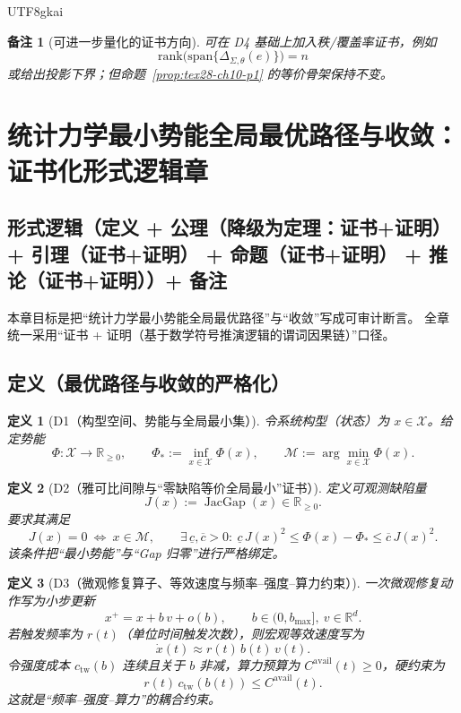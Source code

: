 \documentclass[12pt]{article}
\newtheorem{definition}{定义}[section]
\newtheorem{remark}{备注}[section]
\newcommand{\RR}{\mathbb{R}}
\newcommand{\JacGap}{\operatorname{JacGap}}
\begin{document}
\begin{CJK*}{UTF8}{gkai}
\begin{remark}[可进一步量化的证书方向]
可在 D4 基础上加入秩/覆盖率证书，例如
\[
  \mathrm{rank}\!\bigl(\mathrm{span}\{\Delta_{\Sigma,\theta}(e)\}\bigr)=n
\]
或给出投影下界；但命题~\ref{prop:tex28-ch10-p1} 的等价骨架保持不变。
\end{remark}

\clearpage

\section{统计力学最小势能全局最优路径与收敛：证书化形式逻辑章}
\label{sec:tex28-ch11}

\subsection{形式逻辑（定义 + 公理（降级为定理：证书+证明） + 引理（证书+证明） + 命题（证书+证明） + 推论（证书+证明））+ 备注}
\label{subsec:tex28-ch11-logic-structure}

本章目标是把“统计力学最小势能全局最优路径”与“收敛”写成可审计断言。
全章统一采用“证书 + 证明（基于数学符号推演逻辑的谓词因果链）”口径。

\subsection{定义（最优路径与收敛的严格化）}
\label{subsec:tex28-ch11-defs}

\begin{definition}[D1（构型空间、势能与全局最小集）]
\label{def:tex28-ch11-d1}
令系统构型（状态）为 $x\in\mathcal{X}$。给定势能
\[
  \Phi:\mathcal{X}\to\RR_{\ge 0},
  \qquad
  \Phi_*:=\inf_{x\in\mathcal{X}}\Phi(x),
  \qquad
  \mathcal{M}:=\arg\min_{x\in\mathcal{X}}\Phi(x).
\]
\end{definition}

\begin{definition}[D2（雅可比间隙与“零缺陷等价全局最小”证书）]
\label{def:tex28-ch11-d2}
定义可观测缺陷量
\[
  J(x):=\JacGap(x)\in\RR_{\ge 0}.
\]
要求其满足
\[
  J(x)=0\ \Longleftrightarrow\ x\in\mathcal{M},
  \qquad
  \exists\,\underline c,\overline c>0:\
  \underline c\,J(x)^2\le \Phi(x)-\Phi_*\le \overline c\,J(x)^2.
\]
该条件把“最小势能”与“Gap 归零”进行严格绑定。
\end{definition}

\begin{definition}[D3（微观修复算子、等效速度与频率--强度--算力约束）]
\label{def:tex28-ch11-d3}
一次微观修复动作写为小步更新
\[
  x^+=x+b\,v+o(b),
  \qquad
  b\in(0,b_{\max}],\ v\in\RR^d.
\]
若触发频率为 $r(t)$（单位时间触发次数），则宏观等效速度写为
\[
  \dot x(t)\approx r(t)\,b(t)\,v(t).
\]
令强度成本 $c_{\mathrm{tw}}(b)$ 连续且关于 $b$ 非减，算力预算为 $C^{\mathrm{avail}}(t)\ge 0$，硬约束为
\[
  r(t)\,c_{\mathrm{tw}}(b(t))\le C^{\mathrm{avail}}(t).
\]
这就是“频率--强度--算力”的耦合约束。
\end{definition}


\end{CJK*}
\end{document}
